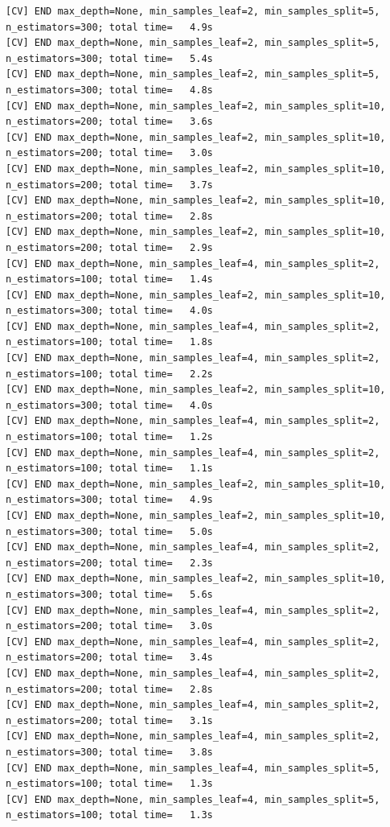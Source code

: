 \documentclass[
  11pt,
  letterpaper,
  DIV=11,
  numbers=noendperiod]{scrartcl}
\begin{document}
\begin{verbatim}
[CV] END max_depth=None, min_samples_leaf=2, min_samples_split=5, n_estimators=300; total time=   4.9s
[CV] END max_depth=None, min_samples_leaf=2, min_samples_split=5, n_estimators=300; total time=   5.4s
[CV] END max_depth=None, min_samples_leaf=2, min_samples_split=5, n_estimators=300; total time=   4.8s
[CV] END max_depth=None, min_samples_leaf=2, min_samples_split=10, n_estimators=200; total time=   3.6s
[CV] END max_depth=None, min_samples_leaf=2, min_samples_split=10, n_estimators=200; total time=   3.0s
[CV] END max_depth=None, min_samples_leaf=2, min_samples_split=10, n_estimators=200; total time=   3.7s
[CV] END max_depth=None, min_samples_leaf=2, min_samples_split=10, n_estimators=200; total time=   2.8s
[CV] END max_depth=None, min_samples_leaf=2, min_samples_split=10, n_estimators=200; total time=   2.9s
[CV] END max_depth=None, min_samples_leaf=4, min_samples_split=2, n_estimators=100; total time=   1.4s
[CV] END max_depth=None, min_samples_leaf=2, min_samples_split=10, n_estimators=300; total time=   4.0s
[CV] END max_depth=None, min_samples_leaf=4, min_samples_split=2, n_estimators=100; total time=   1.8s
[CV] END max_depth=None, min_samples_leaf=4, min_samples_split=2, n_estimators=100; total time=   2.2s
[CV] END max_depth=None, min_samples_leaf=2, min_samples_split=10, n_estimators=300; total time=   4.0s
[CV] END max_depth=None, min_samples_leaf=4, min_samples_split=2, n_estimators=100; total time=   1.2s
[CV] END max_depth=None, min_samples_leaf=4, min_samples_split=2, n_estimators=100; total time=   1.1s
[CV] END max_depth=None, min_samples_leaf=2, min_samples_split=10, n_estimators=300; total time=   4.9s
[CV] END max_depth=None, min_samples_leaf=2, min_samples_split=10, n_estimators=300; total time=   5.0s
[CV] END max_depth=None, min_samples_leaf=4, min_samples_split=2, n_estimators=200; total time=   2.3s
[CV] END max_depth=None, min_samples_leaf=2, min_samples_split=10, n_estimators=300; total time=   5.6s
[CV] END max_depth=None, min_samples_leaf=4, min_samples_split=2, n_estimators=200; total time=   3.0s
[CV] END max_depth=None, min_samples_leaf=4, min_samples_split=2, n_estimators=200; total time=   3.4s
[CV] END max_depth=None, min_samples_leaf=4, min_samples_split=2, n_estimators=200; total time=   2.8s
[CV] END max_depth=None, min_samples_leaf=4, min_samples_split=2, n_estimators=200; total time=   3.1s
[CV] END max_depth=None, min_samples_leaf=4, min_samples_split=2, n_estimators=300; total time=   3.8s
[CV] END max_depth=None, min_samples_leaf=4, min_samples_split=5, n_estimators=100; total time=   1.3s
[CV] END max_depth=None, min_samples_leaf=4, min_samples_split=5, n_estimators=100; total time=   1.3s

\end{verbatim}
\end{document}
